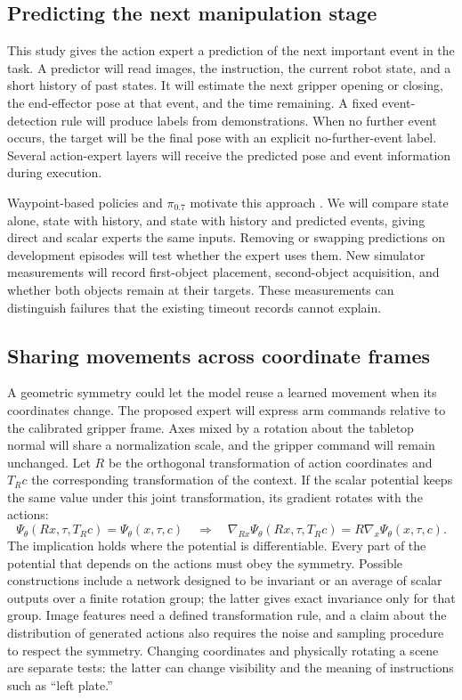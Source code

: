 \subsection{Predicting the next manipulation stage}
This study gives the action expert a prediction of the next important event in the task. A predictor will read images, the instruction, the current robot state, and a short history of past states. It will estimate the next gripper opening or closing, the end-effector pose at that event, and the time remaining. A fixed event-detection rule will produce labels from demonstrations. When no further event occurs, the target will be the final pose with an explicit no-further-event label. Several action-expert layers will receive the predicted pose and event information during execution.

Waypoint-based policies and $\pi_{0.7}$ motivate this approach \cite{xie2026fastplans,physicalintelligence2026pi07}. We will compare state alone, state with history, and state with history and predicted events, giving direct and scalar experts the same inputs. Removing or swapping predictions on development episodes will test whether the expert uses them. New simulator measurements will record first-object placement, second-object acquisition, and whether both objects remain at their targets. These measurements can distinguish failures that the existing timeout records cannot explain.

\subsection{Sharing movements across coordinate frames}
A geometric symmetry could let the model reuse a learned movement when its coordinates change. The proposed expert will express arm commands relative to the calibrated gripper frame. Axes mixed by a rotation about the tabletop normal will share a normalization scale, and the gripper command will remain unchanged. Let $R$ be the orthogonal transformation of action coordinates and $T_Rc$ the corresponding transformation of the context. If the scalar potential keeps the same value under this joint transformation, its gradient rotates with the actions:
\begin{equation}
\Psi_\theta(Rx,\tau,T_Rc)=\Psi_\theta(x,\tau,c)
\quad\Longrightarrow\quad
\nabla_{Rx}\Psi_\theta(Rx,\tau,T_Rc)=R\nabla_x\Psi_\theta(x,\tau,c).
\end{equation}
The implication holds where the potential is differentiable. Every part of the potential that depends on the actions must obey the symmetry. Possible constructions include a network designed to be invariant or an average of scalar outputs over a finite rotation group; the latter gives exact invariance only for that group. Image features need a defined transformation rule, and a claim about the distribution of generated actions also requires the noise and sampling procedure to respect the symmetry. Changing coordinates and physically rotating a scene are separate tests: the latter can change visibility and the meaning of instructions such as ``left plate.''

